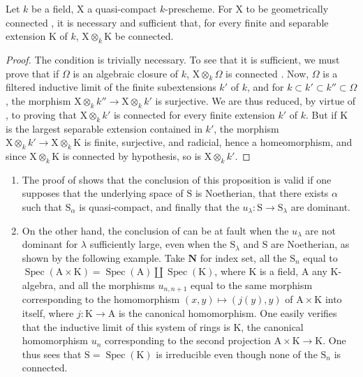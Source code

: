 \begin{corollary}[8.4.5]
\label{IV.8.4.5}
Let $k$ be a field, $\mathrm{X}$ a quasi-compact $k$-prescheme.
For $\mathrm{X}$ to be geometrically connected , it is necessary and sufficient that, for every finite and separable extension $\mathrm{K}$ of $k$, $\mathrm{X}\otimes_k\mathrm{K}$ be connected.
\end{corollary}

\begin{proof}
The condition is trivially necessary.
To see that it is sufficient, we must prove that if $\Omega$ is an algebraic closure of $k$, $\mathrm{X}\otimes_k\Omega$ is connected .
Now, $\Omega$ is a filtered inductive limit of the finite subextensions $k'$ of $k$, and for $k\subset k'\subset k''\subset\Omega$, the morphism $\mathrm{X}\otimes_k k''\to\mathrm{X}\otimes_k k'$ is surjective.
We are thus reduced, by virtue of , to proving that $\mathrm{X}\otimes_k k'$ is connected for every finite extension $k'$ of $k$.
But if $\mathrm{K}$ is the largest separable extension contained in $k'$, the morphism $\mathrm{X}\otimes_k k'\to\mathrm{X}\otimes_k\mathrm{K}$ is finite, surjective, and radicial, hence  a homeomorphism, and since $\mathrm{X}\otimes_k\mathrm{K}$ is connected by hypothesis, so is $\mathrm{X}\otimes_k k'$.
\end{proof}

\begin{remark}[8.4.6]
\label{IV.8.4.6}
\begin{enumerate}[label=(\roman*)]
  \item The proof of  shows that the conclusion of this proposition is valid if one supposes that the underlying space of $\mathrm{S}$ is Noetherian, that there exists $\alpha$ such that $\mathrm{S}_\alpha$ is quasi-compact, and finally that the $u_\lambda:\mathrm{S}\to\mathrm{S}_\lambda$ are dominant.
  \item On the other hand, the conclusion of  can be at fault when the $u_\lambda$ are not dominant for $\lambda$ sufficiently large, even when the $\mathrm{S}_\lambda$ and $\mathrm{S}$ are Noetherian, as shown by the following example.
Take $\mathbf{N}$ for index set, all the $\mathrm{S}_n$ equal to $\operatorname{Spec}(\mathrm{A}\times\mathrm{K})=\operatorname{Spec}(\mathrm{A})\amalg\operatorname{Spec}(\mathrm{K})$, where $\mathrm{K}$ is a field, $\mathrm{A}$ any $\mathrm{K}$-algebra, and all the morphisms $u_{n,n+1}$ equal to the same morphism corresponding to the homomorphism $(x,y)\mapsto(j(y),y)$ of $\mathrm{A}\times\mathrm{K}$ into itself, where $j:\mathrm{K}\to\mathrm{A}$ is the canonical homomorphism.
One easily verifies that the inductive limit of this system of rings is $\mathrm{K}$, the canonical homomorphism $u_n$ corresponding to the second projection $\mathrm{A}\times\mathrm{K}\to\mathrm{K}$.
One thus sees that $\mathrm{S}=\operatorname{Spec}(\mathrm{K})$ is irreducible even though none of the $\mathrm{S}_n$ is connected.
\end{enumerate}
\end{remark}

